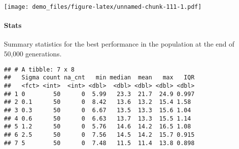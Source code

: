\documentclass[]{book}
\newenvironment{Shaded}{\begin{snugshade}}{\end{snugshade}}
\newcommand{\DataTypeTok}[1]{\textcolor[rgb]{0.13,0.29,0.53}{#1}}
\newcommand{\KeywordTok}[1]{\textcolor[rgb]{0.13,0.29,0.53}{\textbf{#1}}}
\newcommand{\NormalTok}[1]{#1}
\newcommand{\OperatorTok}[1]{\textcolor[rgb]{0.81,0.36,0.00}{\textbf{#1}}}
\newcommand{\OtherTok}[1]{\textcolor[rgb]{0.56,0.35,0.01}{#1}}
\newcommand{\StringTok}[1]{\textcolor[rgb]{0.31,0.60,0.02}{#1}}
\let\oldparagraph\paragraph
\renewcommand{\paragraph}[1]{\oldparagraph{#1}\mbox{}}
\begin{document}
\texttt{[image: demo\_files/figure-latex/unnamed-chunk-111-1.pdf]}

\hypertarget{stats-59}{%
\paragraph{Stats}\label{stats-59}}

Summary statistics for the best performance in the population at the end of 50,000 generations.

\begin{Shaded}
\end{Shaded}

\begin{verbatim}
## # A tibble: 7 x 8
##   Sigma count na_cnt   min median  mean   max   IQR
##   <fct> <int>  <int> <dbl>  <dbl> <dbl> <dbl> <dbl>
## 1 0        50      0  5.99   23.3  21.7  24.9 0.997
## 2 0.1      50      0  8.42   13.6  13.2  15.4 1.58 
## 3 0.3      50      0  6.67   13.5  13.3  15.6 1.04 
## 4 0.6      50      0  6.63   13.7  13.3  15.5 1.14 
## 5 1.2      50      0  5.76   14.6  14.2  16.5 1.08 
## 6 2.5      50      0  7.56   14.5  14.2  15.7 0.915
## 7 5        50      0  7.48   11.5  11.4  13.8 0.898
\end{verbatim}
\end{document}
